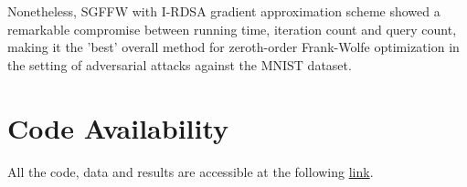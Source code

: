 \documentclass[10pt,twocolumn,letterpaper]{article}
\begin{document}
Nonetheless, SGFFW with I-RDSA gradient approximation scheme showed a remarkable
compromise between running time, iteration count and query count, making it the 'best' overall method
for zeroth-order Frank-Wolfe optimization in the setting of adversarial attacks against the MNIST dataset.



\section{Code Availability}

All the code, data and results are accessible at the following \href{https://github.com/marcouderzo/FW-AdversarialAttacks}{link}.

{\small


}
\end{document}
